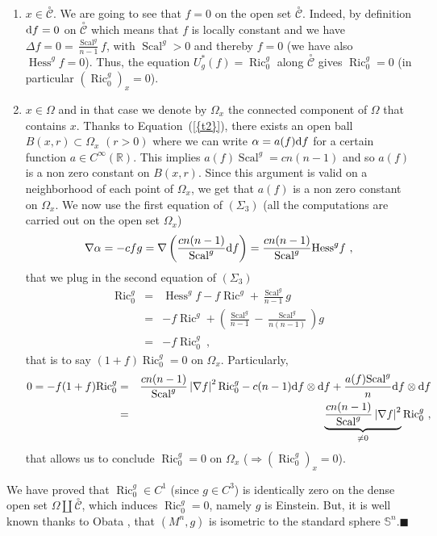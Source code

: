 \documentclass[a4paper,11pt,leqno]{amsart}
\numberwithin{equation}{section}
\theoremstyle{main}
\begin{document}
\begin{enumerate}
	\item  $x\in \overset{\circ}{\mathcal{C}}$. We are going to see that $f=0$ on the open set $\overset{\circ}{\mathcal{C}}$. Indeed, by definition ${{\rm d}} f=0$ on $\overset{\circ}{\mathcal{C}}$ which means that $f$ is locally constant and we have $\Delta f=0=\frac{{\operatorname{Scal}}^g}{n-1}f$, with ${\operatorname{Scal}}^g>0$ and thereby $f=0$ (we have also ${\operatorname{Hess}}^g f=0$). Thus, the equation $U^*_g (f)={\operatorname{Ric}}^g_0$ along $\overset{\circ}{\mathcal{C}}$ gives ${\operatorname{Ric}}^g_0=0$ (in particular $({\operatorname{Ric}}^g_0)_x=0$).\\
	\item $x\in \Omega$ and in that case we denote by $\Omega_x$ the connected component of $\Omega$ that contains $x$. Thanks to Equation~({\ref{{t2}}}), there exists an open ball $B(x,r) \subset\Omega_x$ $(r>0)$ where we can write ${\alpha=a(f){{\rm d}} f}$ for a certain function $a\in C^{\infty}({{\mathbb R}})$. This implies $a(f){\operatorname{Scal}}^g =cn(n-1)$ and so $a(f)$ is a non zero constant on $B(x,r)$. Since this argument is valid on a neighborhood of each point of $\Omega_x$, we get that $a(f)$ is a non zero constant on $\Omega_x$. We now use the first equation of $(\Sigma_3)$ (all the computations are carried out on the open set $\Omega_x$)
$$ \nabla\alpha=-cfg= \nabla\left(\frac{cn(n-1)}{{\operatorname{Scal}}^g}{{\rm d}} f\right)= \frac{cn(n-1)}{{\operatorname{Scal}}^g}{\operatorname{Hess}}^g f \ , $$
that we plug in the second equation of $(\Sigma_3)$
\begin{eqnarray*}
	{\operatorname{Ric}}^g_0&=& {\operatorname{Hess}}^g f -f{\operatorname{Ric}}^g + \frac{{\operatorname{Scal}}^g}{n-1}g\\
	&=& -f{\operatorname{Ric}}^g + \left(\frac{{\operatorname{Scal}}^g}{n-1}- \frac{{\operatorname{Scal}}^g}{n(n-1)}\right)g\\
	&=& -f{\operatorname{Ric}}^g_0 \ ,
\end{eqnarray*}
that is to say $(1+f){\operatorname{Ric}}^g_0=0$ on $\Omega_x$. Particularly,
\begin{eqnarray*}
	0=-f(1+f){\operatorname{Ric}}^g_0&=& \frac{cn(n-1)}{{\operatorname{Scal}}^g}\left|\nabla f\right|^2 {\operatorname{Ric}}^g_0 -c(n-1){{\rm d}} f\otimes{{\rm d}} f + \frac{a(f){\operatorname{Scal}}^g}{n}{{\rm d}} f\otimes {{\rm d}} f \\
	&=&\underbrace{ \frac{cn(n-1)}{{\operatorname{Scal}}^g}\left|\nabla f\right|^2}_{\neq 0} {\operatorname{Ric}}^g_0 \ ,
\end{eqnarray*}
that allows us to conclude $ {\operatorname{Ric}}^g_0=0$ on $\Omega_x$ ($\Rightarrow({\operatorname{Ric}}^g_0)_x=0$).
\end{enumerate}
We have proved that ${\operatorname{Ric}}^g_0\in C^1$ (since $g\in C^3$) is identically zero on the dense open set $\Omega\coprod\overset{\circ}{\mathcal{C}}$, which induces ${\operatorname{Ric}}^g_0 =0$, namely $g$ is Einstein. But, it is well known thanks to Obata \cite{O}, that $(M^n,g)$ is isometric to the standard sphere ${{\mathbb S^{n}}}$.{\hfill $\blacksquare$ \medskip \\}
\end{document}
